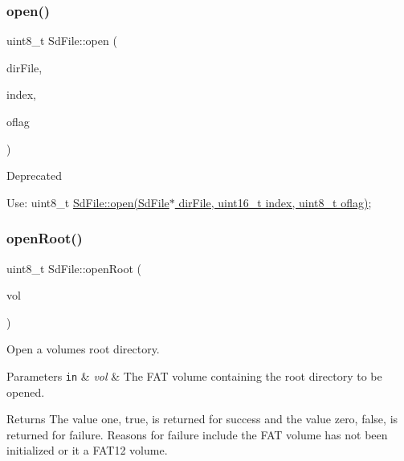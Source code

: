 \subsubsection{\texorpdfstring{open()}{open()}\hspace{0.1cm}{\footnotesize\ttfamily [5/5]}}
{\footnotesize\ttfamily uint8\+\_\+t Sd\+File\+::open (\begin{DoxyParamCaption}\item[{\hyperlink{class_sd_file}{Sd\+File} \&}]{dir\+File,  }\item[{uint16\+\_\+t}]{index,  }\item[{uint8\+\_\+t}]{oflag }\end{DoxyParamCaption})\hspace{0.3cm}{\ttfamily [inline]}}

\begin{DoxyRefDesc}{Deprecated}
\item[\hyperlink{deprecated__deprecated000008}{Deprecated}]Use\+: uint8\+\_\+t \hyperlink{class_sd_file_a9e211ac14784f48aebb213194336f8cc}{Sd\+File\+::open(\+Sd\+File$\ast$ dir\+File, uint16\+\_\+t index, uint8\+\_\+t oflag)}; \end{DoxyRefDesc}
\mbox{\label{class_sd_file_ac3612bc27eaf52a23d8cb85c8d96ad38}} 
\subsubsection{\texorpdfstring{open\+Root()}{openRoot()}\hspace{0.1cm}{\footnotesize\ttfamily [1/2]}}
{\footnotesize\ttfamily uint8\+\_\+t Sd\+File\+::open\+Root (\begin{DoxyParamCaption}\item[{\hyperlink{class_sd_volume}{Sd\+Volume} $\ast$}]{vol }\end{DoxyParamCaption})}

Open a volume\textquotesingle{}s root directory.


\begin{DoxyParams}[1]{Parameters}
\mbox{\tt in}  & {\em vol} & The F\+AT volume containing the root directory to be opened.\\
\hline
\end{DoxyParams}
\begin{DoxyReturn}{Returns}
The value one, true, is returned for success and the value zero, false, is returned for failure. Reasons for failure include the F\+AT volume has not been initialized or it a F\+A\+T12 volume. 
\end{DoxyReturn}
\mbox{\label{class_sd_file_abc60bbbb747c58319cfcfc11deb34d53}} 
